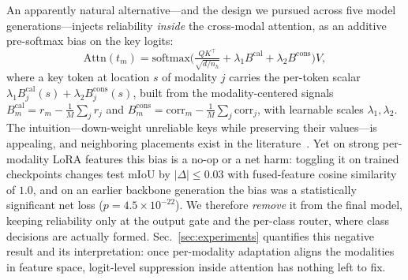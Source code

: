 An apparently natural alternative---and the design we pursued across five
model generations---injects reliability \emph{inside} the cross-modal
attention, as an additive pre-softmax bias on the key logits:
\begin{equation}
\mathrm{Attn}(t_m) = \mathrm{softmax}\!\Big(\tfrac{QK^{\top}}{\sqrt{d/n_h}}
+ \lambda_1 B^{\mathrm{cal}} + \lambda_2 B^{\mathrm{cons}}\Big)V,
\label{eq:attnbias}
\end{equation}
where a key token at location $s$ of modality $j$ carries the per-token
scalar $\lambda_1 B^{\mathrm{cal}}_j(s)+\lambda_2 B^{\mathrm{cons}}_j(s)$,
built from the modality-centered signals
$B^{\mathrm{cal}}_m=r_m-\frac{1}{M}\sum_j r_j$ and
$B^{\mathrm{cons}}_m=\mathrm{corr}_m-\frac{1}{M}\sum_j \mathrm{corr}_j$,
with learnable scales $\lambda_1,\lambda_2$. The intuition---down-weight
unreliable keys while preserving their values---is appealing, and
neighboring placements exist in the
literature~\cite{primed2026,sae2026,sam2long2024}. Yet on strong per-modality
LoRA features this bias is a no-op or a net harm: toggling it on trained
checkpoints changes test mIoU by $|\Delta|\le 0.03$ with fused-feature
cosine similarity of $1.0$, and on an earlier backbone generation the bias
was a statistically significant net loss ($p=4.5\times10^{-22}$). We
therefore \emph{remove} it from the final model, keeping reliability only at
the output gate and the per-class router, where class decisions are actually
formed. Sec.~\ref{sec:experiments} quantifies this negative result and its
interpretation: once per-modality adaptation aligns the modalities in feature
space, logit-level suppression inside attention has nothing left to fix.
